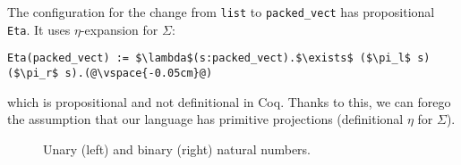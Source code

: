 The configuration for the change from \lstinline{list} to \lstinline{packed_vect} has propositional \lstinline{Eta}.
It uses $\eta$-expansion for $\Sigma$:

\begin{lstlisting}
Eta(packed_vect) := $\lambda$(s:packed_vect).$\exists$ ($\pi_l$ s) ($\pi_r$ s).(@\vspace{-0.05cm}@)
\end{lstlisting}
which is propositional and not definitional in Coq.
Thanks to this, we can forego the assumption that our language has primitive projections (definitional $\eta$ for $\Sigma$).

\begin{figure}
\begin{minipage}{0.44\columnwidth}
   
\end{minipage}
\hfill
\begin{minipage}{0.54\columnwidth}
   
\end{minipage}
\vspace{-0.4cm}
\caption{Unary (left) and binary (right) natural numbers.}
\vspace{-0.2cm}
\label{fig:nattobin}
\end{figure}

